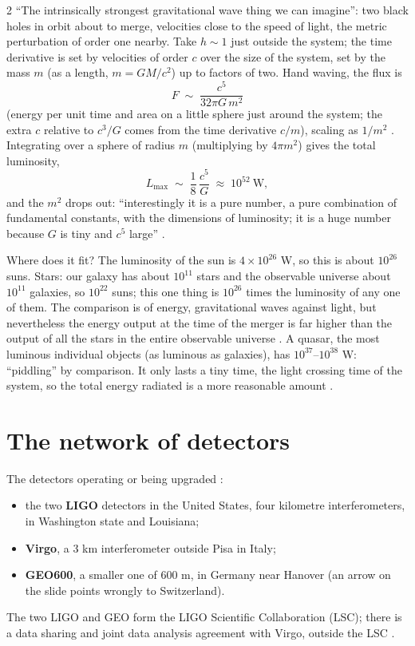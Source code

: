 \begin{paracol}{2}
``The intrinsically strongest gravitational wave thing we can imagine'': two black holes in orbit about to merge, velocities close to the speed of light, the metric perturbation of order one nearby. Take $h\sim1$ just outside the system; the time derivative is set by velocities of order $c$ over the size of the system, set by the mass $m$ (as a length, $m=GM/c^2$) up to factors of two. Hand waving, the flux is
\[
  F\;\sim\;\frac{c^{5}}{32\pi G\,m^{2}}
\]
(energy per unit time and area on a little sphere just around the system; the extra $c$ relative to $c^3/G$ comes from the time derivative $c/m$), scaling as $1/m^2$ . Integrating over a sphere of radius $m$ (multiplying by $4\pi m^2$) gives the total luminosity,
\[
  L_{\max}\;\sim\;\frac18\,\frac{c^{5}}{G}\;\approx\;10^{52}\ \mathrm W,
\]
and the $m^2$ drops out: ``interestingly it is a pure number, a pure combination of fundamental constants, with the dimensions of luminosity; it is a huge number because $G$ is tiny and $c^5$ large'' .

Where does it fit? The luminosity of the sun is $4\times10^{26}$ W, so this is about $10^{26}$ suns. Stars: our galaxy has about $10^{11}$ stars and the observable universe about $10^{11}$ galaxies, so $10^{22}$ suns; this one thing is $10^{26}$ times the luminosity of any one of them. The comparison is of energy, gravitational waves against light, but nevertheless the energy output at the time of the merger is far higher than the output of all the stars in the entire observable universe . A quasar, the most luminous individual objects (as luminous as galaxies), has $10^{37}$--$10^{38}$ W: ``piddling'' by comparison. It only lasts a tiny time, the light crossing time of the system, so the total energy radiated is a more reasonable amount .

\section{The network of detectors}\label{sec:c27-network}

The detectors operating or being upgraded :
\begin{itemize}
  \item the two \textbf{LIGO} detectors in the United States, four kilometre interferometers, in Washington state and Louisiana;
  \item \textbf{Virgo}, a 3 km interferometer outside Pisa in Italy;
  \item \textbf{GEO600}, a smaller one of 600 m, in Germany near Hanover (an arrow on the slide points wrongly to Switzerland).
\end{itemize}
The two LIGO and GEO form the LIGO Scientific Collaboration (LSC); there is a data sharing and joint data analysis agreement with Virgo, outside the LSC .


\end{paracol}
